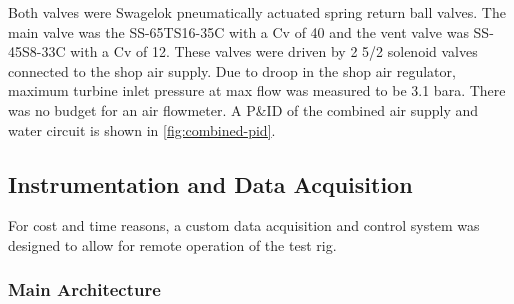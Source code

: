 Both valves were Swagelok pneumatically actuated spring return ball valves. The main valve was the  SS-65TS16-35C with a Cv of 40 and the vent valve was SS-45S8-33C with a Cv of 12. These valves were driven by 2 5/2 solenoid valves connected to the shop air supply. Due to droop in the shop air regulator, maximum turbine inlet pressure at max flow was measured to be 3.1 bara. There was no budget for an air flowmeter. A P\&ID of the combined air supply and water circuit is shown in \cref{fig:combined-pid}.






\subsection{Instrumentation and Data Acquisition}

For cost and time reasons, a custom data acquisition and control system was designed to allow for remote operation of the test rig. 

\subsubsection{Main Architecture}

